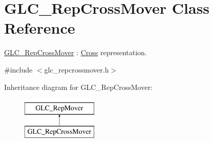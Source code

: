 \hypertarget{class_g_l_c___rep_cross_mover}{\section{G\-L\-C\-\_\-\-Rep\-Cross\-Mover Class Reference}
\label{class_g_l_c___rep_cross_mover}
}


\hyperlink{class_g_l_c___rep_cross_mover}{G\-L\-C\-\_\-\-Rep\-Cross\-Mover} \-: \hyperlink{class_cross}{Cross} representation.  




{\ttfamily \#include $<$glc\-\_\-repcrossmover.\-h$>$}

Inheritance diagram for G\-L\-C\-\_\-\-Rep\-Cross\-Mover\-:\begin{figure}[H]
\begin{center}
\leavevmode
\includegraphics[height=2.000000cm]{class_g_l_c___rep_cross_mover}
\end{center}
\end{figure}

